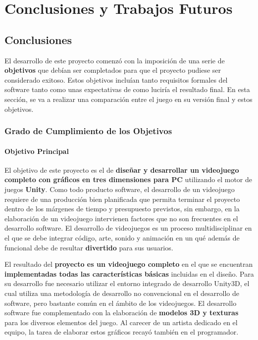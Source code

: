\chapter{Conclusiones y Trabajos Futuros}
\label{Conclusiones}
\section{Conclusiones}
El desarrollo de este proyecto comenzó con la imposición de una serie de \textbf{objetivos} que debían ser completados para que el proyecto pudiese ser considerado exitoso. Estos objetivos incluían tanto requisitos formales del software tanto como unas expectativas de como luciría el resultado final. En esta sección, se va a realizar una comparación entre el juego en su versión final y estos objetivos.

\subsection{Grado de Cumplimiento de los Objetivos}
\subsubsection{Objetivo Principal}
El objetivo de este proyecto es el de \textbf{diseñar y desarrollar un videojuego completo con gráficos en tres dimensiones para PC} utilizando el motor de juegos \textbf{Unity}. Como todo producto software, el desarrollo de un videojuego requiere de una producción bien planificada que permita terminar el proyecto dentro de los márgenes de tiempo y presupuesto previstos, sin embargo, en la elaboración de un videojuego intervienen factores que no son frecuentes en el desarrollo software. El desarrollo de videojuegos es un proceso multidisciplinar en el que se debe integrar código, arte, sonido y animación en un qué además de funcional debe de resultar \textbf{divertido} para sus usuarios.

El resultado del \textbf{proyecto es un videojuego completo} en el que se encuentran \textbf{implementadas todas las características básicas} incluidas en el diseño. Para su desarrollo fue necesario utilizar el entorno integrado de desarrollo Unity3D, el cual utiliza una metodología de desarrollo no convencional en el desarrollo de software, pero bastante común en el ámbito de los videojuegos. El desarrollo software fue complementado con la elaboración de \textbf{modelos 3D y texturas} para los diversos elementos del juego. Al carecer de un artista dedicado en el equipo, la tarea de elaborar estos gráficos recayó también en el programador.

